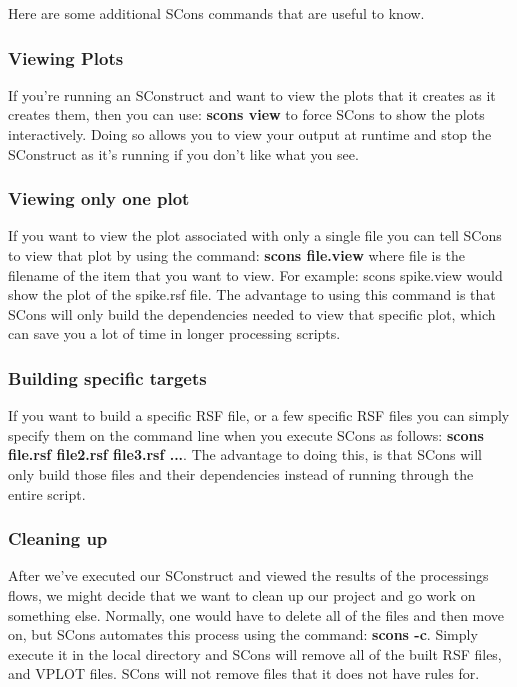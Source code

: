 Here are some additional SCons commands that are useful to know.

\subsubsection{Viewing Plots}

If you're running an SConstruct and want to view the plots that it creates as it creates them, then you can use: \textbf{scons view} to force SCons to show the plots interactively.  Doing so allows you to view your output at runtime and stop the SConstruct as it's running if you don't like what you see.

\subsubsection{Viewing only one plot}

If you want to view the plot associated with only a single file you can tell SCons to view that plot by using the command: \textbf{scons file.view} where file is the filename of the item that you want to view.  For example: scons spike.view would show the plot of the spike.rsf file.  The advantage to using this command is that SCons will only build the dependencies needed to view that specific plot, which can save you a lot of time in longer processing scripts.

\subsubsection{Building specific targets}

If you want to build a specific RSF file, or a few specific RSF files you can simply specify them on the command line when you execute SCons as follows: \textbf{scons file.rsf file2.rsf file3.rsf ...}.  The advantage to doing this, is that SCons will only build those files and their dependencies instead of running through the entire script.

\subsubsection{Cleaning up}

After we've executed our SConstruct and viewed the results of the processings flows, we might decide that we want to clean up our project and go work on something else.  Normally, one would have to delete all of the files and then move on, but SCons automates this process using the command: \textbf{scons -c}.  Simply execute it in the local directory and SCons will remove all of the built RSF files, and VPLOT files.  SCons will not remove files that it does not have rules for.

